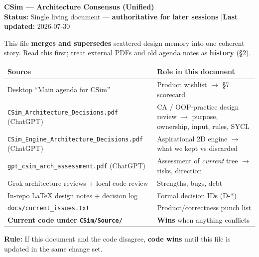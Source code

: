 \documentclass[10pt,a4paper]{article}
\begin{document}
\begin{center}
    {\LARGE \bfseries \textcolor{navyblue}{CSim --- Architecture Consensus (Unified)}} \\[0.4em]
    {\small \textbf{Status:} Single living document --- \textbf{authoritative for later sessions} \quad|\quad \textbf{Last updated:} 2026-07-30}
\end{center}

\vspace{0.2em}
\noindent This file \textbf{merges and supersedes} scattered design memory into one coherent story. Read this first; treat external PDFs and old agenda notes as \textbf{history} (\S 2).

\vspace{0.8em}

\begin{table}[h!]
\centering
\small
\begin{tabularx}{\textwidth}{l X}
\toprule
\textbf{Source} & \textbf{Role in this document} \\
\midrule
Desktop ``Main agenda for CSim'' & Product wishlist $\rightarrow$ \S7 scorecard \\
\texttt{CSim\_Architecture\_Decisions.pdf} (ChatGPT) & CA / OOP-practice design review $\rightarrow$ purpose, ownership, input, rules, SYCL \\
\texttt{CSim\_Engine\_Architecture\_Decisions.pdf} (ChatGPT) & Aspirational 2D engine $\rightarrow$ what we kept vs discarded \\
\texttt{gpt\_csim\_arch\_assessment.pdf} (ChatGPT) & Assessment of \textit{current} tree $\rightarrow$ risks, direction \\
Grok architecture reviews + local code review & Strengths, bugs, debt \\
In-repo LaTeX design notes + decision log & Formal decision IDs (D-*) \\
\texttt{docs/current\_issues.txt} & Product/correctness punch list \\
\textbf{Current code under \texttt{CSim/Source/}} & \textbf{Wins} when anything conflicts \\
\bottomrule
\end{tabularx}
\end{table}

\begin{tcolorbox}[colback=lightgrey,colframe=slate,boxrule=0.5pt,arc=2pt]
\textbf{Rule:} If this document and the code disagree, \textbf{code wins} until this file is updated in the same change set.
\end{tcolorbox}
\end{document}
